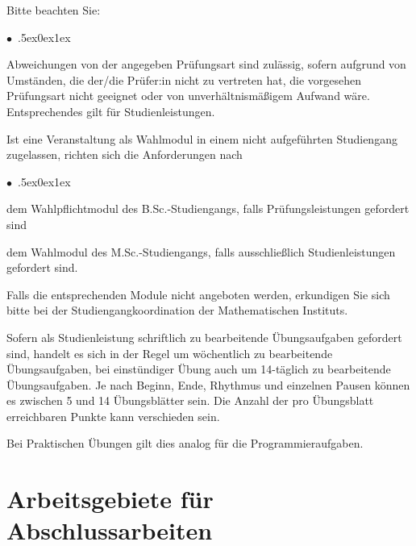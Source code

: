 \documentclass[a4paper,10pt]{article}
\renewenvironment{itemize}{\begin{list}{$\bullet$\ }{\itemsep.5ex\setlength{\topsep}{0.5\itemsep}\parsep0ex\labelsep1ex\settowidth{\labelwidth}{$\bullet$\ }\setlength{\leftmargin}{\labelwidth}\addtolength{\leftmargin}{3ex}\addtolength{\leftmargin}{\labelsep}}}{\end{list}}
\begin{document}
\medskip
Bitte beachten Sie:

\begin{itemize}
\item
  Abweichungen von der angegeben Prüfungsart sind zulässig, sofern aufgrund von Umständen,
  die der/die Prüfer:in nicht zu vertreten hat, die vorgesehen Prüfungsart nicht geeignet
  oder von unverhältnismäßigem Aufwand wäre. Entsprechendes gilt für Studienleistungen.
\item
  Ist eine Veranstaltung als Wahlmodul in einem nicht aufgeführten Studiengang zugelassen,
  richten sich die Anforderungen nach
  \begin{itemize}
  \item
    dem Wahlpflichtmodul des B.Sc.-Studiengangs, falls Prüfungsleistungen gefordert sind
  \item
    dem Wahlmodul des M.Sc.-Studiengangs, falls ausschließlich Studienleistungen gefordert sind.
  \end{itemize}
  Falls die entsprechenden Module nicht angeboten werden, erkundigen Sie sich bitte
  bei der Studiengangkoordination der Mathematischen Instituts.
\item
  Sofern als Studienleistung schriftlich zu bearbeitende Übungsaufgaben gefordert sind,
  handelt es sich in der Regel um wöchentlich zu bearbeitende Übungsaufgaben,
  bei einstündiger Übung auch um 14-täglich zu bearbeitende Übungsaufgaben.
  Je nach Beginn, Ende, Rhythmus und einzelnen Pausen können es zwischen 5 und 14 Übungsblätter sein.
  Die Anzahl der pro Übungsblatt erreichbaren Punkte kann verschieden sein.
\item    
  Bei Praktischen Übungen gilt dies analog für die Programmieraufgaben.
\end{itemize}



%


\newpage
\section*{Arbeitsgebiete f\"ur Abschlussarbeiten}
\end{document}
